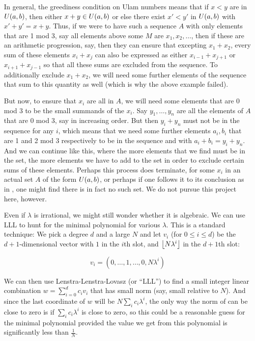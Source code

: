 \documentclass{report}
\theoremstyle{remark}
\numberwithin{equation}{section}
\begin{document}
In general, the greediness condition on Ulam numbers means that if
$x < y$ are in $U(a,b)$, then either $x+y \in U(a,b)$ or
else there exist $x' < y'$ in $U(a,b)$ with $x'+y' = x+y$.  Thus,
if we were to have such a sequence $A$ with only elements that are 1
mod 3, say all elements above some $M$ are $x_1, x_2, \ldots$, then if
these are an arithmetic progression, say, then they can ensure that
excepting $x_1 + x_2$, every sum of these elements $x_i + x_j$ can also
be expressed as either $x_{i-1} + x_{j+1}$ or $x_{i+1}+x_{j-1}$ so
that all these sums are excluded from the sequence.  To additionally
exclude $x_1 + x_2$, we will need some further elements of the
sequence that sum to this quantity as well (which is why the above
example failed).

But now, to ensure that $x_i$ are all in $A$, we will need some
elements that are 0 mod 3 to be the small summands of the $x_i$.  Say
$y_1, \ldots, y_n$ are all the elements of $A$ that are 0 mod 3, say
in increasing order.  But then $y_i + y_n$ must not be in the sequence
for any $i$, which means that we need some further elements $a_i, b_i$
that are 1 and 2 mod 3 respectively to be in the sequence and with
$a_i+b_i = y_i + y_n$.  And we can continue like this, where the more
elements that we find must be in the set, the more elements we have to
add to the set in order to exclude certain sums of these elements.
Perhaps this process does terminate, for some $x_i$ in an actual set
$A$ of the form $U(a,b)$, or perhaps if one follows it to its
conclusion as in \cite{schmerl:jct1994}, one might find there is in
fact no such set.  We do not pursue this project here, however.

Even if $\lambda$ is irrational, we might still wonder whether it is
algebraic.  We can use LLL to hunt for the minimal polynomial for
various $\lambda$.  This is a standard technique: We pick a degree $d$
and a large $N$ and let $v_i$ (for $0 \leq i \leq d$) be the
$d+1$-dimensional vector with $1$ in the $i$th slot, and
$\left\lfloor N\lambda^i \right\rfloor$ in the $d+1$th slot:

\[v_i = \left(0, \ldots, 1, \ldots, 0, N\lambda^i\right)\]

We can then use Lenstra-Lenstra-Lovasz (or ``LLL'') to find a small
integer linear combination $w = \sum_{i=0}^d c_i v_i$ that has small
norm (say, small relative to $N$).  And since the last coordinate of
$w$ will be $N \sum_i c_i \lambda^i$, the only way the norm of can be
close to zero is if $\sum_i c_i \lambda^i$ is close to zero, so this
could be a reasonable guess for the minimal polynomial provided the
value we get from this polynomial is significantly less than
$\frac{1}{N}$.
\end{document}
